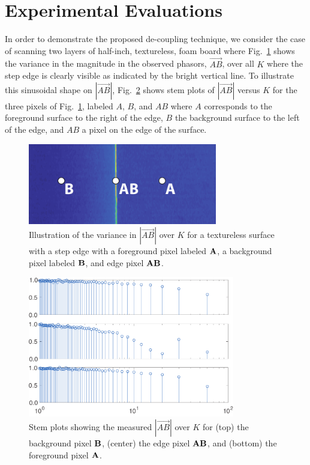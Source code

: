 \documentclass[10pt]{article}
\begin{document}
\section{Experimental Evaluations}
\noindent In order to demonstrate the proposed de-coupling technique, we consider the case of scanning two layers of half-inch, textureless, foam board where Fig.~\ref{fig02} shows the variance in the magnitude in the observed phasors, $\vec{AB}$, over all $K$ where the step edge is clearly visible as indicated by the bright vertical line.  To illustrate this sinusoidal shape on $|\vec{AB}|$, Fig.~\ref{fig03} shows stem plots of $|\vec{AB}|$ versus $K$ for the three pixels of Fig.~\ref{fig02}, labeled $A$, $B$, and $AB$ where $A$ corresponds to the foreground surface to the right of the edge, $B$ the background surface to the left of the edge, and $AB$ a pixel on the edge of the surface.  

\begin{figure}[!t]
\centering\includegraphics[width=3.25in]{Figures/figure02}
\caption{Illustration of the variance in $|\vec{AB}|$ over $K$ for a textureless surface with a step edge with a foreground pixel labeled ${\bf A}$, a background pixel labeled ${\bf B}$, and edge pixel ${\bf AB}$.}
\label{fig02}
\end{figure}

\begin{figure}[!t]
\centering\includegraphics[width=3.55in]{Figures/figure03}
\caption{Stem plots showing the measured $|\vec{AB}|$ over $K$ for (top) the background pixel ${\bf B}$, (center) the edge pixel ${\bf AB}$, and (bottom) the foreground pixel ${\bf A}$.}
\label{fig03}
\end{figure}
\end{document}
